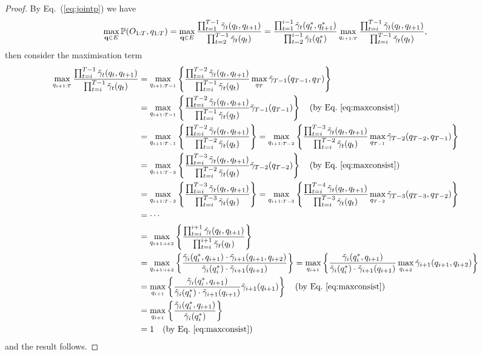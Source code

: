 \begin{proof}
By Eq.~(\ref{eq:jointp}) we have
\begin{equation*}
\max_{\mathbf{q} \in E} \mathbb{P}(O_{1:T}, q_{1:T}) 
= \max_{\mathbf{q} \in E} \frac{\prod_{t=1}^{T-1} \tilde{\gamma}_t(q_t, q_{t+1})} {\prod_{t=2}^{T-1} \tilde{\gamma}_t(q_t)}  
= \frac{\prod_{t=1}^{i-1} \tilde{\gamma}_t(q_t^*, q_{t+1}^*)} {\prod_{t=2}^{i-1} \tilde{\gamma}_t(q_t^*)} 
  \max_{q_{i+1:T}} \frac{\prod_{t=i}^{T-1} \tilde{\gamma}_t(q_t, q_{t+1})} {\prod_{t=i}^{T-1} \tilde{\gamma}_t(q_t)},
\end{equation*}
then consider the maximisation term
\begin{align*}
\max_{q_{i+1:T}} \frac{\prod_{t=i}^{T-1} \tilde{\gamma}_t(q_t, q_{t+1})} {\prod_{t=i}^{T-1} \tilde{\gamma}_t(q_t)}
&= \max_{q_{i+1:T-1}} \left\{ \frac{\prod_{t=i}^{T-2} \tilde{\gamma}_t(q_t, q_{t+1})} {\prod_{t=i}^{T-1} \tilde{\gamma}_t(q_t)}
   \max_{q_{T}} \tilde{\gamma}_{T-1}(q_{T-1}, q_T) \right\} \\
&= \max_{q_{i+1:T-1}} \left\{ \frac{\prod_{t=i}^{T-2} \tilde{\gamma}_t(q_t, q_{t+1})} {\prod_{t=i}^{T-1} \tilde{\gamma}_t(q_t)}
   \tilde{\gamma}_{T-1}(q_{T-1}) \right\} 
   ~~~ \text{(by Eq.~\ref{eq:maxconsist})} \\
&= \max_{q_{i+1:T-1}} \left\{ \frac{\prod_{t=i}^{T-2} \tilde{\gamma}_t(q_t, q_{t+1})} {\prod_{t=i}^{T-2} \tilde{\gamma}_t(q_t)} \right\}
 = \max_{q_{i+1:T-2}} \left\{ \frac{\prod_{t=i}^{T-3} \tilde{\gamma}_t(q_t, q_{t+1})} {\prod_{t=i}^{T-2} \tilde{\gamma}_t(q_t)}
   \max_{q_{T-1}} \tilde{\gamma}_{T-2}(q_{T-2}, q_{T-1}) \right\} \\
&= \max_{q_{i+1:T-2}} \left\{ \frac{\prod_{t=i}^{T-3} \tilde{\gamma}_t(q_t, q_{t+1})} {\prod_{t=i}^{T-2} \tilde{\gamma}_t(q_t)}
   \tilde{\gamma}_{T-2}(q_{T-2}) \right\}
   ~~~ \text{(by Eq.~\ref{eq:maxconsist})} \\
&= \max_{q_{i+1:T-2}} \left\{ \frac{\prod_{t=i}^{T-3} \tilde{\gamma}_t(q_t, q_{t+1})} {\prod_{t=i}^{T-3} \tilde{\gamma}_t(q_t)} \right\}
 = \max_{q_{i+1:T-3}} \left\{ \frac{\prod_{t=i}^{T-4} \tilde{\gamma}_t(q_t, q_{t+1})} {\prod_{t=i}^{T-3} \tilde{\gamma}_t(q_t)}
   \max_{q_{T-2}} \tilde{\gamma}_{T-3}(q_{T-3}, q_{T-2}) \right\} \\
&= \cdots \\
&= \max_{q_{i+1:i+2}} \left\{ \frac{\prod_{t=i}^{i+1} \tilde{\gamma}_t(q_t, q_{t+1})} {\prod_{t=i}^{i+1} \tilde{\gamma}_t(q_t)} \right\} \\
&= \max_{q_{i+1:i+2}} \left\{ \frac{\tilde{\gamma}_i(q_i^*, q_{i+1}) \cdot \tilde{\gamma}_{i+1}(q_{i+1}, q_{i+2})} 
                                   {\tilde{\gamma}_i(q_i^*) \cdot \tilde{\gamma}_{i+1}(q_{i+1})} \right\}
 = \max_{q_{i+1}} \left\{ \frac{\tilde{\gamma}_i(q_i^*, q_{i+1})} 
                               {\tilde{\gamma}_i(q_i^*) \cdot \tilde{\gamma}_{i+1}(q_{i+1})} 
                          \max_{q_{i+2}} \tilde{\gamma}_{i+1}(q_{i+1}, q_{i+2}) \right\} \\
&= \max_{q_{i+1}} \left\{ \frac{\tilde{\gamma}_i(q_i^*, q_{i+1})} 
                               {\tilde{\gamma}_i(q_i^*) \cdot \tilde{\gamma}_{i+1}(q_{i+1})} \tilde{\gamma}_{i+1}(q_{i+1}) \right\}
   ~~~ \text{(by Eq.~\ref{eq:maxconsist})} \\
&= \max_{q_{i+1}} \left\{ \frac{\tilde{\gamma}_i(q_i^*, q_{i+1})} {\tilde{\gamma}_i(q_i^*)} \right\} \\
&= 1 ~~~ \text{(by Eq.~\ref{eq:maxconsist})}
\end{align*}
and the result follows.
\end{proof}

